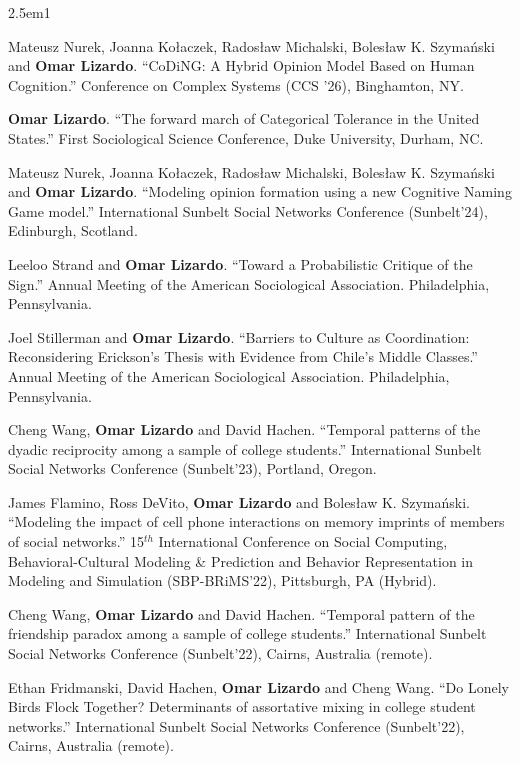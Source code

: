 \documentclass[
]{article}
\newenvironment{cventry}{\begin{hangparas}{2.5em}{1}}{\end{hangparas}}
\begin{document}
\begin{cventry}

Mateusz Nurek, Joanna Kołaczek, Radosław Michalski, Bolesław K.
Szymański and \textbf{Omar Lizardo}. ``CoDiNG: A Hybrid Opinion Model
Based on Human Cognition.'' Conference on Complex Systems (CCS '26),
Binghamton, NY.

\textbf{Omar Lizardo}. ``The forward march of Categorical Tolerance in
the United States.'' First Sociological Science Conference, Duke
University, Durham, NC.

Mateusz Nurek, Joanna Kołaczek, Radosław Michalski, Bolesław K.
Szymański and \textbf{Omar Lizardo}. ``Modeling opinion formation using
a new Cognitive Naming Game model.'' International Sunbelt Social
Networks Conference (Sunbelt'24), Edinburgh, Scotland.

Leeloo Strand and \textbf{Omar Lizardo}. ``Toward a Probabilistic
Critique of the Sign.'' Annual Meeting of the American Sociological
Association. Philadelphia, Pennsylvania.

Joel Stillerman and \textbf{Omar Lizardo}. ``Barriers to Culture as
Coordination: Reconsidering Erickson's Thesis with Evidence from Chile's
Middle Classes.'' Annual Meeting of the American Sociological
Association. Philadelphia, Pennsylvania.

Cheng Wang, \textbf{Omar Lizardo} and David Hachen. ``Temporal patterns
of the dyadic reciprocity among a sample of college students.''
International Sunbelt Social Networks Conference (Sunbelt'23), Portland,
Oregon.

James Flamino, Ross DeVito, \textbf{Omar Lizardo} and Bolesław K.
Szymański. ``Modeling the impact of cell phone interactions on memory
imprints of members of social networks.'' 15\(^{th}\) International
Conference on Social Computing, Behavioral-Cultural Modeling \&
Prediction and Behavior Representation in Modeling and Simulation
(SBP-BRiMS'22), Pittsburgh, PA (Hybrid).

Cheng Wang, \textbf{Omar Lizardo} and David Hachen. ``Temporal pattern
of the friendship paradox among a sample of college students.''
International Sunbelt Social Networks Conference (Sunbelt'22), Cairns,
Australia (remote).

Ethan Fridmanski, David Hachen, \textbf{Omar Lizardo} and Cheng Wang.
``Do Lonely Birds Flock Together? Determinants of assortative mixing in
college student networks.'' International Sunbelt Social Networks
Conference (Sunbelt'22), Cairns, Australia (remote).


\end{cventry}
\end{document}
